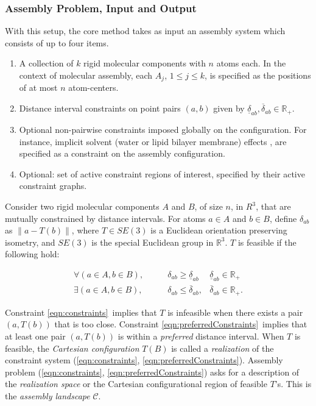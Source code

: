\documentclass[]{article}
\newcommand{\norm}[1]{\left\lVert#1\right\rVert}
\newcommand{\dst}{\delta}  \newcommand{\dlo}{\underline{\dst}}
\newcommand{\dhi}{\overline{\dst}}
\newcommand{\rmc}{rigid molecular component}
\newcommand{\distall}{$C_1$}
\newcommand{\distexist}{$C_2$}
\newcommand{\ctwo}{\ref{eqn:preferredConstraints}}
\newcommand{\cone}{\ref{eqn:constraints}}
\newcommand{\psone}{A}
\newcommand{\pstwo}{B}
\newcommand{\pone}{a}
\newcommand{\ptwo}{b}
\newcommand{\ijx}{{\pone\ptwo}}
\begin{document}
\subsubsection{Assembly Problem, Input and Output}
\label{sec:methods:furtherIO}
\noindent With this setup, the core method takes as input an assembly system which
consists of up to four items.
\begin{enumerate}
\item A collection of $k$ \rmc s with $n$ atoms each. In the
context of molecular assembly, each $A_j$, $1 \le j \le k$, is specified as the
positions of at most $n$ atom-centers.

\item Distance interval constraints on point pairs $(a, b)$ given by $\dlo_\ijx, \dhi_\ijx
\in \mathbb{R}_+$.

\item Optional non-pairwise constraints imposed globally on the configuration. For
instance, implicit solvent (water or lipid bilayer membrane) effects
\cite{Lazaridis_Karplus_1999, Lazaridis_2003, Im_Feig_Brooks_2003}, are
specified as a constraint on the assembly configuration.

\item Optional: set of active constraint regions of interest, specified 
by their active constraint graphs.

\end{enumerate}

Consider two \rmc s $\psone$ and $\pstwo$, of size $n$, in $R^3$, that are
mutually constrained by distance intervals. For atoms $a\in A$ and $b\in B$, define
$\dst_\ijx$ as $\norm{a-T(b)}$, where 
$T \in SE(3)$ is a Euclidean orientation preserving isometry, and $SE(3)$ is
the special Euclidean group in $\mathbb{R}^3$.
$T$ is feasible if the following hold:

\begin{align}
\forall (\pone \in \psone, \ptwo \in \pstwo),\qquad& \dst_\ijx \ge \dlo_\ijx& \dlo_\ijx \in \mathbb{R}_+ \tag{\distall}\label{eqn:constraints}\\
\exists (\pone \in \psone, \ptwo \in \pstwo),\qquad& \dst_\ijx  \le \dhi_\ijx, & \dhi_\ijx \in \mathbb{R}_+.\tag{\distexist}\label{eqn:preferredConstraints}
\end{align}


\noindent Constraint \cone\ implies that $T$ is infeasible when there exists a
pair $(\pone, T(\ptwo))$ that is too close. Constraint \ctwo\ implies that at
least one pair $(\pone, T(\ptwo))$ is within a \emph{preferred} distance
interval.  When $T$ is feasible, the \emph{Cartesian configuration} $T(\pstwo)$
is called a \emph{realization} of the constraint system (\cone, \ctwo).
Assembly problem (\cone, \ctwo) asks for a description of the \emph{realization
space} or the Cartesian configurational region of feasible $T$'s.
This is the \emph{assembly landscape} $\mathcal{C}$.
\end{document}
